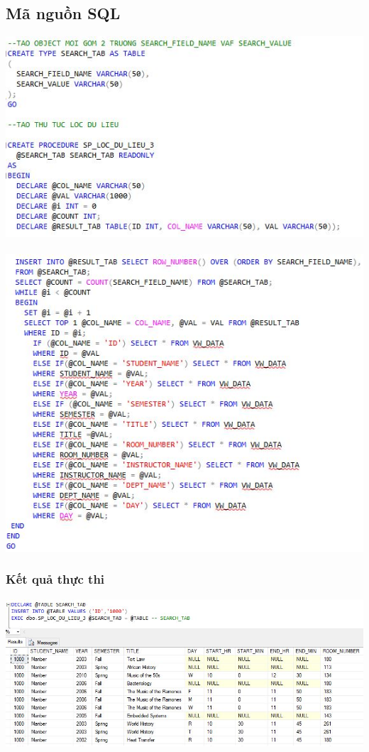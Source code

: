 \documentclass[12pt,a4paper]{report}
\begin{document}
\subsection{Mã nguồn SQL}
\includegraphics[scale=.9]{b3s1.jpg}\\\\
\includegraphics[scale=.9]{b3s2.jpg}
\subsubsection{Kết quả thực thi}
\includegraphics[scale=.7]{kb3s.jpg}
\end{document}
